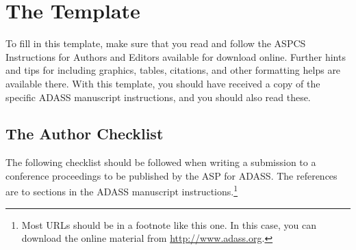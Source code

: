 \documentclass[11pt,twoside]{article}
\begin{document}
\section{The Template}
To fill in this template, make sure that you read and follow the ASPCS Instructions for Authors and Editors available for download online. Further hints and tips for including graphics, tables, citations, and other formatting helps are available there. With this template, you should have received a copy of the specific ADASS manuscript instructions, and you should also read these.

\subsection{The Author Checklist}
The following checklist should be followed when writing a submission to a conference proceedings to be published by the ASP for ADASS. The references are to sections in the ADASS manuscript instructions.\footnote{Most URLs should be in a footnote like this one.  In this case, you can download the online material from \url{http://www.adass.org}.} 
\end{document}
